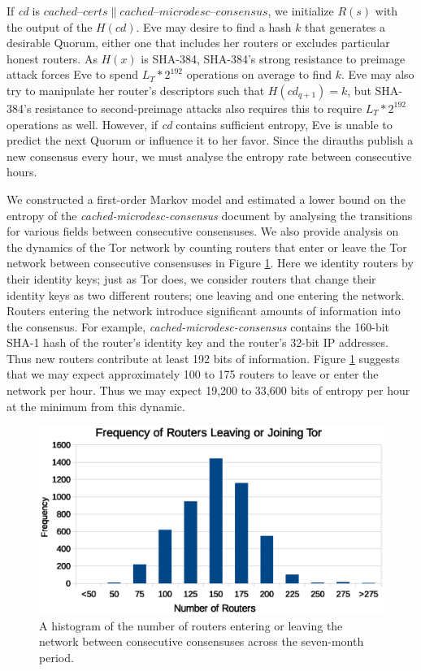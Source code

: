 \documentclass{sig-alternate}
\newcommand*\concat{\mathbin{\|}}
\begin{document}
If \emph{cd} is $ \mathit{cached \mbox{--} certs} \concat \mathit{cached \mbox{--} microdesc \mbox{--} consensus} $, we initialize $ \mathit{R}(s) $ with the output of the $ H(\mathit{cd}) $. Eve may desire to find a hash $ k $ that generates a desirable Quorum, either one that includes her routers or excludes particular honest routers. As $ H(x) $ is SHA-384, SHA-384's strong resistance to preimage attack forces Eve to spend $ L_{T} * 2^{192} $ operations on average to find $ k $. Eve may also try to manipulate her router's descriptors such that $ H(\mathit{cd}_{q+1}) = k $, but SHA-384's resistance to second-preimage attacks also requires this to require $ L_{T} * 2^{192} $ operations as well. However, if \emph{cd} contains sufficient entropy, Eve is unable to predict the next Quorum or influence it to her favor. Since the dirauths publish a new consensus every hour, we must analyse the entropy rate between consecutive hours.

We constructed a first-order Markov model and estimated a lower bound on the entropy of the \emph{cached-microdesc-consensus} document by analysing the transitions for various fields between consecutive consensuses. We also provide analysis on the dynamics of the Tor network by counting routers that enter or leave the Tor network between consecutive consensuses in Figure \ref{fig:xorRouters}. Here we identity routers by their identity keys; just as Tor does, we consider routers that change their identity keys as two different routers; one leaving and one entering the network. Routers entering the network introduce significant amounts of information into the consensus. For example, \emph{cached-microdesc-consensus} contains the 160-bit SHA-1 hash of the router's identity key and the router's 32-bit IP addresses. Thus new routers contribute at least 192 bits of information. Figure \ref{fig:xorRouters} suggests that we may expect approximately 100 to 175 routers to leave or enter the network per hour. Thus we may expect 19,200 to 33,600 bits of entropy per hour at the minimum from this dynamic.

\begin{figure}[h]
	\centering
	\includegraphics[width=\linewidth]{../analysis/LeaveJoinFrequency.eps}
	\caption{A histogram of the number of routers entering or leaving the network between consecutive consensuses across the seven-month period.}
	\label{fig:xorRouters}
\end{figure}
\end{document}
